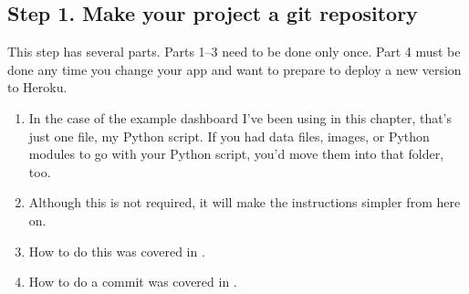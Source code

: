 \documentclass[letterpaper,10pt,english]{jupyterBook}
\begin{document}
\subsection{Step 1. Make your project a git repository}
\label{\detokenize{chapter-14-dashboards:step-1-make-your-project-a-git-repository}}
\sphinxAtStartPar
This step has several parts.  Parts 1–3 need to be done only once.  Part 4 must be done any time you change your app and want to prepare to deploy a new version to Heroku.
\begin{enumerate}
%
\item {} 
\sphinxAtStartPar
{}  In the case of the example dashboard I’ve been using in this chapter, that’s just one file, my Python script.  If you had data files, images, or Python modules to go with your Python script, you’d move them into that folder, too.

\item {} 
\sphinxAtStartPar
{}  Although this is not required, it will make the instructions simpler from here on.

\item {} 
\sphinxAtStartPar
{}  How to do this was covered in .

\item {} 
\sphinxAtStartPar
{}  How to do a commit was covered in .

\end{enumerate}
\end{document}

